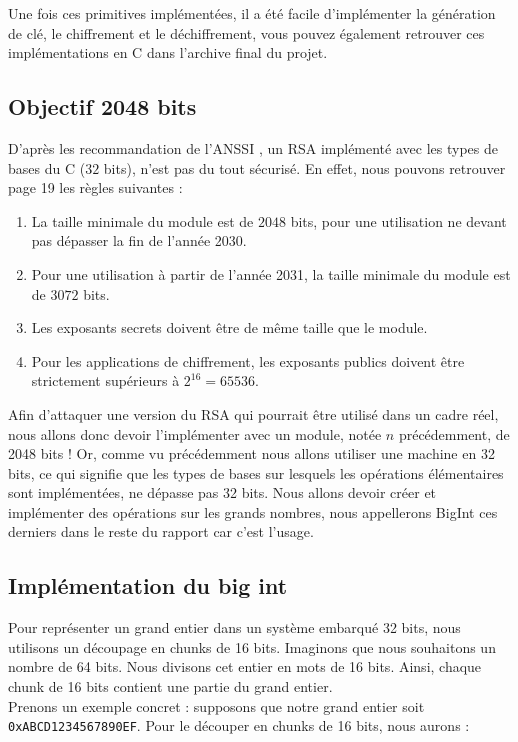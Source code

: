Une fois ces primitives implémentées, il a été facile d'implémenter la génération de clé, le chiffrement et le déchiffrement, vous pouvez également retrouver ces implémentations en C dans l'archive final du projet.

\subsection{Objectif 2048 bits}
D'après les recommandation de l'ANSSI \cite{anssi:guide}, un RSA implémenté avec les types de bases du C ($32$ bits), n'est pas du tout sécurisé. En effet, nous pouvons retrouver page 19 les règles suivantes :
\begin{enumerate}
  \item La taille minimale du module est de $2048$ bits, pour une utilisation ne devant
pas dépasser la fin de l’année 2030.
  \item Pour une utilisation à partir de l’année 2031, la taille minimale du module
est de $3072$ bits.
  \item Les exposants secrets doivent être de même taille que le module.
  \item Pour les applications de chiffrement, les exposants publics doivent être strictement supérieurs à $2^{16} = 65536$.
\end{enumerate}
Afin d'attaquer une version du RSA qui pourrait être utilisé dans un cadre réel, nous allons donc devoir l'implémenter avec un module, notée $n$ précédemment, de 2048 bits ! Or, comme vu précédemment nous allons utiliser une machine en 32 bits, ce qui signifie que les types de bases sur lesquels les opérations élémentaires sont implémentées, ne dépasse pas 32 bits. Nous allons devoir créer et implémenter des opérations sur les grands nombres, nous appellerons BigInt ces derniers dans le reste du rapport car c'est l'usage.

\subsection{Implémentation du big int}
Pour représenter un grand entier dans un système embarqué 32 bits, nous utilisons un découpage en chunks de 16 bits. Imaginons que nous souhaitons un nombre de 64 bits. Nous divisons cet entier en mots de 16 bits. Ainsi, chaque chunk de 16 bits contient une partie du grand entier.\\

Prenons un exemple concret : supposons que notre grand entier soit \texttt{0xABCD1234567890EF}. Pour le découper en chunks de 16 bits, nous aurons :

